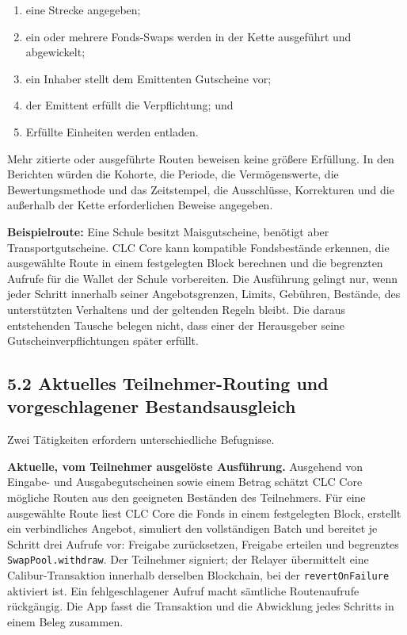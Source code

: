 \documentclass[11pt]{article}
\begin{document}
\begin{enumerate}[leftmargin=*]
\item eine Strecke angegeben;
\item ein oder mehrere Fonds-Swaps werden in der Kette ausgeführt und abgewickelt;
\item ein Inhaber stellt dem Emittenten Gutscheine vor;
\item der Emittent erfüllt die Verpflichtung; und
\item Erfüllte Einheiten werden entladen.
\end{enumerate}
Mehr zitierte oder ausgeführte Routen beweisen keine größere Erfüllung. In den Berichten würden die Kohorte, die Periode, die Vermögenswerte, die Bewertungsmethode und das Zeitstempel, die Ausschlüsse, Korrekturen und die außerhalb der Kette erforderlichen Beweise angegeben.

\textbf{Beispielroute:} Eine Schule besitzt Maisgutscheine, benötigt aber Transportgutscheine. CLC Core kann kompatible Fondsbestände erkennen, die ausgewählte Route in einem festgelegten Block berechnen und die begrenzten Aufrufe für die Wallet der Schule vorbereiten. Die Ausführung gelingt nur, wenn jeder Schritt innerhalb seiner Angebotsgrenzen, Limits, Gebühren, Bestände, des unterstützten Verhaltens und der geltenden Regeln bleibt. Die daraus entstehenden Tausche belegen nicht, dass einer der Herausgeber seine Gutscheinverpflichtungen später erfüllt.

\subsection*{5.2 Aktuelles Teilnehmer-Routing und vorgeschlagener Bestandsausgleich}

Zwei Tätigkeiten erfordern unterschiedliche Befugnisse.

\textbf{Aktuelle, vom Teilnehmer ausgelöste Ausführung.} Ausgehend von Eingabe- und Ausgabegutscheinen sowie einem Betrag schätzt CLC Core mögliche Routen aus den geeigneten Beständen des Teilnehmers. Für eine ausgewählte Route liest CLC Core die Fonds in einem festgelegten Block, erstellt ein verbindliches Angebot, simuliert den vollständigen Batch und bereitet je Schritt drei Aufrufe vor: Freigabe zurücksetzen, Freigabe erteilen und begrenztes \texttt{SwapPool.withdraw}. Der Teilnehmer signiert; der Relayer übermittelt eine Calibur-Transaktion innerhalb derselben Blockchain, bei der \texttt{revertOnFailure} aktiviert ist. Ein fehlgeschlagener Aufruf macht sämtliche Routenaufrufe rückgängig. Die App fasst die Transaktion und die Abwicklung jedes Schritts in einem Beleg zusammen.
\end{document}
